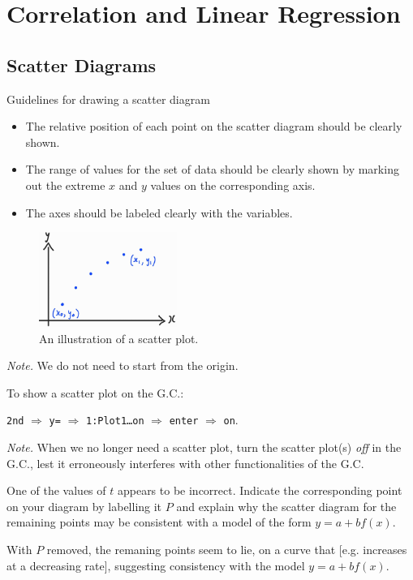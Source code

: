 \documentclass[../Notes.tex]{subfiles}
\begin{document}
\chapter{Correlation and Linear Regression}
\section{Scatter Diagrams}
\begin{note}
  Guidelines for drawing a scatter diagram
  \begin{itemize}
    \item The relative position of each point on the scatter diagram should be clearly shown.
    \item The range of values for the set of data should be clearly shown by marking out the extreme \(x\) and \(y\) values on the corresponding axis.
    \item The axes should be labeled clearly with the variables.
  \end{itemize}
  \begin{figure}[H]
    \centering
    \includegraphics[width=0.4\textwidth]{../images/scatter-plot-example.jpg}
    \caption{An illustration of a scatter plot.}
    \label{fig:example-scatter-plot-how-to-draw}
  \end{figure}
  \emph{Note.} We do not need to start from the origin.
\end{note}
\begin{GCSkills}{}
  To show a scatter plot on the G.C.:
  \begin{center}
    \texttt{2nd} \(\Longrightarrow\) \texttt{y=} \(\Longrightarrow\)  \texttt{1:Plot1\dots on} \(\Longrightarrow\) \texttt{enter} \(\Longrightarrow\)  \texttt{on}.
  \end{center} 
  \emph{Note.} When we no longer need a scatter plot, turn the scatter plot(s) \emph{off} in the G.C., lest it erroneously interferes with other functionalities of the G.C.
\end{GCSkills}
\begin{example}{}{}
  One of the values of \(t\) appears to be incorrect. Indicate the corresponding point on your diagram by labelling it \(P\) and explain why the scatter diagram for the remaining points may be consistent with a model of the form \(y=a+bf(x)\). 
  \begin{center}
    \parbox{0.9\textwidth}{
      With \(P\) removed, the remaning points seem to lie, on a curve that [e.g. increases at a decreasing rate], suggesting consistency with the model \(y=a+bf(x)\).
    }
  \end{center}
\end{example}
\end{document}
